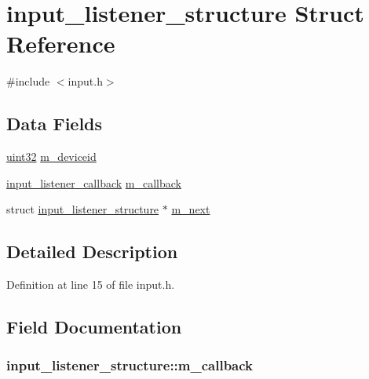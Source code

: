 \hypertarget{structinput__listener__structure}{
\section{input\_\-listener\_\-structure Struct Reference}
\label{structinput__listener__structure}
}


{\ttfamily \#include $<$input.h$>$}

\subsection*{Data Fields}
\begin{DoxyCompactItemize}
\item 
\hyperlink{int__types_8h_a1134b580f8da4de94ca6b1de4d37975e}{uint32} \hyperlink{structinput__listener__structure_a21758f6b8e1d90056b68757c4880124a}{m\_\-deviceid}
\item 
\hyperlink{input_8h_a249f249fa5e8b527ea82b0a7b4257691}{input\_\-listener\_\-callback} \hyperlink{structinput__listener__structure_a3385ab00d1a349dcef982b6f522e87e6}{m\_\-callback}
\item 
struct \hyperlink{structinput__listener__structure}{input\_\-listener\_\-structure} $\ast$ \hyperlink{structinput__listener__structure_a504494642fba1478dc9cfac0fe6c9692}{m\_\-next}
\end{DoxyCompactItemize}


\subsection{Detailed Description}


Definition at line 15 of file input.h.



\subsection{Field Documentation}
\hypertarget{structinput__listener__structure_a3385ab00d1a349dcef982b6f522e87e6}{
\subsubsection[{m\_\-callback}]{ {\bf input\_\-listener\_\-structure::m\_\-callback}}}
\label{structinput__listener__structure_a3385ab00d1a349dcef982b6f522e87e6}



